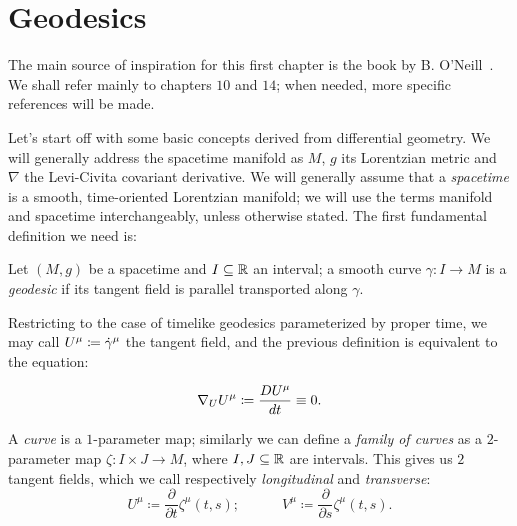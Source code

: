 \section{Geodesics}

\label{sec:geodesics}

The main source of inspiration for this first chapter is the book by B. O'Neill~\cite{o1983semi}. We shall refer mainly to chapters \(10\) and \(14\); when needed, more specific references will be made.

Let's start off with some basic concepts derived from differential geometry. We will generally address the spacetime manifold as \(M\), \(g\) its Lorentzian metric and \(\nabla\) the Levi-Civita covariant derivative.
We will generally assume that a \emph{spacetime} is a smooth, time-oriented Lorentzian manifold; we will use the terms manifold and spacetime interchangeably, unless otherwise stated.
The first fundamental definition we need is:
\begin{definition}
	Let \((M, g)\) be a spacetime and \(I \subseteq {\mathbb{R}}\) an interval; a smooth curve \(\gamma : I \rightarrow M\) is a \emph{geodesic} if its tangent field is parallel transported along \(\gamma\).
\end{definition}    
Restricting to the case of timelike geodesics parameterized by proper time, we may call \(U\indices{^{\mu}} \coloneqq \dot{\gamma}^{\mu}\) the tangent field, and the previous definition is equivalent to the equation:

\begin{equation}
\label{eq:tang-trans-fields}
\nabla_U U^{\mu} \coloneqq \frac{D\tensor{U}{^\mu} }{dt} \equiv 0.
\end{equation}

A \emph{curve} is a \(1\)-parameter map; similarly we can define a \emph{family of curves} as a \(2\)-parameter map \(\zeta: I \times J \rightarrow M\), where \(I, J \subseteq {\mathbb{R}}\) are intervals. This gives us \(2\) tangent fields, which we call respectively \emph{longitudinal} and \emph{transverse}:
\[
U^{\mu} \coloneqq \frac{\partial}{\partial t} \zeta^{\mu}(t,s); \quad \quad \quad 
V^{\mu} \coloneqq \frac{\partial}{\partial s} \zeta^{\mu}(t,s). 
\]

